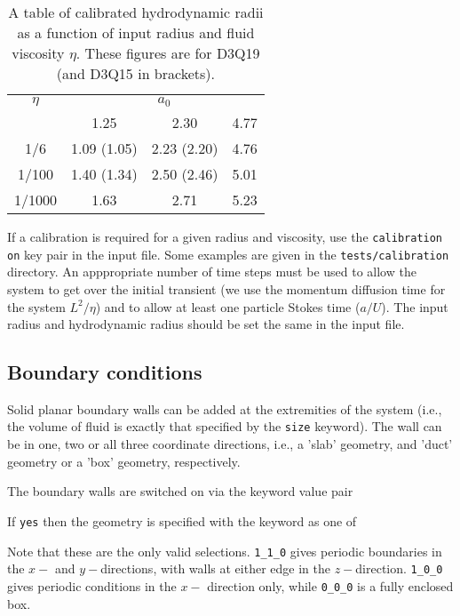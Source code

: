 \begin{table}[h]
\begin{center}
\begin{tabular}{|c|c|c|c|}
\hline
$\eta$ & \multicolumn{3}{c|}{$a_0$}\\ \cline{2-4} 
       & 1.25 & 2.30 & 4.77 \\
\hline
1/6  & 1.09 (1.05) & 2.23 (2.20) & 4.76 \\
1/100  & 1.40 (1.34) & 2.50 (2.46) & 5.01 \\
1/1000  & 1.63 & 2.71 & 5.23 \\
\hline
\end{tabular}
\end{center}
\caption{A table of calibrated hydrodynamic radii as a function of input
radius and fluid viscosity $\eta$. These figures are for D3Q19 (and D3Q15
in brackets).}
\end{table}

If a calibration is required for a given radius and viscosity,
use the \texttt{calibration on} key pair in the input file. Some
examples are given in the \texttt{tests/calibration} directory.
An apppropriate
number of time steps must be used to allow the system to get over
the initial transient (we use the momentum diffusion time for the
system $L^2/\eta$) and to allow at least one
particle Stokes time ($a/U$). The input radius and hydrodynamic
radius should be set the same in the input file.


\subsection{Boundary conditions}

Solid planar boundary walls can be added at the extremities of the
system (i.e., the volume of fluid is exactly that specified by
the \texttt{size} keyword). The wall can be in one, two or all three
coordinate directions, i.e., a 'slab' geometry, and 'duct' geometry
or a 'box' geometry, respectively.

The boundary walls are switched on via the keyword value pair


If \texttt{yes} then the geometry is specified with the keyword
as one of


Note that these are the only valid selections. \texttt{1\_1\_0}
gives periodic boundaries in the $x-$ and $y-$directions, with
walls at either edge in the $z-$direction. \texttt{1\_0\_0}
gives periodic conditions in the $x-$ direction only, while
\texttt{0\_0\_0} is a fully enclosed box.

